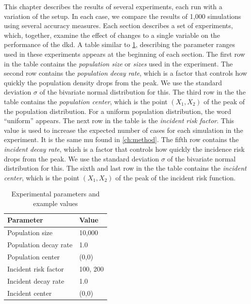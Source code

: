 

This chapter describes the results of several experiments, each run with a variation of the setup.
In each case, we compare the results of 1,000 simulations using several accuracy measures.
Each section describes a set of experiments, which, together, examine the effect of changes to a single variable on the performance of the \gls{dkd}.
A table similar to \cref{tab:params:template}, describing the parameter ranges used in these experiments appears at the beginning of each section.
The first row in the table contains the \textit{population size} or \textit{sizes} used in the experiment.
The second row contains the \textit{\gls{population decay rate}}, which is a factor that controls how quickly the population density drops from the peak.
We use the standard deviation \(\sigma\) of the bivariate normal distribution for this.
The third row in the the table contains the \textit{population center}, which is the point \((X_1, X_2)\) of the peak of the population distribution.
For a uniform population distribution, the word ``uniform'' appears.
The next row in the table is the \textit{incident risk factor}.
This value is used to increase the expected number of cases for each simulation in the experiment.
It is the same \gls{mu} found in \cref{ch:method}.
The fifth row contains the \textit{\gls{incident decay rate}}, which is a factor that controls how quickly the incidence risk drops from the peak.
We use the standard deviation \(\sigma\) of the bivariate normal distribution for this.
The sixth and last row in the the table contains the \textit{incident center}, which is the point \((X_1, X_2)\) of the peak of the incident risk function.

\begin{table}[htbp]
\centering
\begin{tabular}{ll}
\hline
Parameter & Value \\
\hline
Population size & 10,000 \\
Population decay rate & 1.0 \\
Population center & (0,0) \\
Incident risk factor & 100, 200 \\
Incident decay rate & 1.0 \\
Incident center & (0,0) \\
\hline
\end{tabular}
\caption{Experimental parameters and example values}
\label{tab:params:template}
\end{table}


